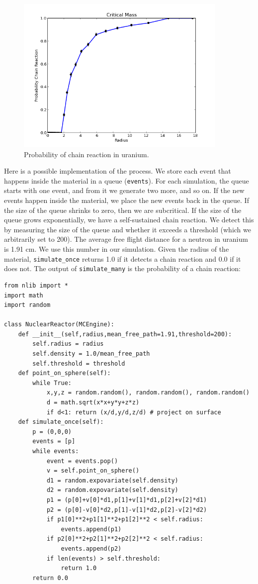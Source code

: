 \documentclass[justified,sixbynine]{tufte-book}
\def\ft{\small\tt}
\theoremstyle{plain}%
\theoremstyle{definition}
\theoremstyle{remark}
\begin{document}
\begin{fullwidth}
\begin{figure}[ht]
\centering\includegraphics[width=4in]{images/nuclear.png}
\caption{Probability of chain reaction in uranium.\label{nuclear2}}
\end{figure}

Here is a possible implementation of the process. We store each event that happens inside the material in a queue ({\ft events}). For each simulation, the queue starts with one event, and from it we generate two more, and so on. If the new events happen inside the material, we place the new events back in the queue. If the size of the queue shrinks to zero, then we are subcritical. If the size of the queue grows exponentially, we have a self-sustained chain reaction. We detect this by measuring the size of the queue and whether it exceeds a threshold (which we arbitrarily set to 200). The average free flight distance for a neutron in  uranium is 1.91 cm. We use this number in our simulation. Given the radius of the material, {\ft simulate\_once} returns 1.0 if it detects a chain reaction and 0.0 if it does not. The output of {\ft simulate\_many} is the probability of a chain reaction:


\begin{lstlisting}[caption={in file: {\ft nuclear.py}}]
from nlib import *
import math
import random

class NuclearReactor(MCEngine):
    def __init__(self,radius,mean_free_path=1.91,threshold=200):
        self.radius = radius
        self.density = 1.0/mean_free_path
        self.threshold = threshold
    def point_on_sphere(self):
        while True:
            x,y,z = random.random(), random.random(), random.random()
            d = math.sqrt(x*x+y*y+z*z)
            if d<1: return (x/d,y/d,z/d) # project on surface
    def simulate_once(self):
        p = (0,0,0)
        events = [p]
        while events:
            event = events.pop()
            v = self.point_on_sphere()
            d1 = random.expovariate(self.density)
            d2 = random.expovariate(self.density)
            p1 = (p[0]+v[0]*d1,p[1]+v[1]*d1,p[2]+v[2]*d1)
            p2 = (p[0]-v[0]*d2,p[1]-v[1]*d2,p[2]-v[2]*d2)
            if p1[0]**2+p1[1]**2+p1[2]**2 < self.radius:
                events.append(p1)
            if p2[0]**2+p2[1]**2+p2[2]**2 < self.radius:
                events.append(p2)
            if len(events) > self.threshold:
                return 1.0
        return 0.0


\end{lstlisting}
\end{fullwidth}
\end{document}
